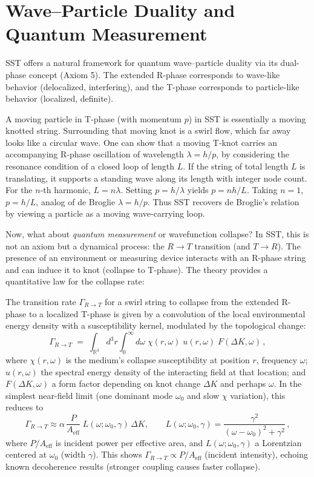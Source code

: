 \documentclass[10pt,reprint,aps,onecolumn,nofootinbib]{revtex4-2}
\begin{document}

	\section{Wave–Particle Duality and Quantum Measurement}
	SST offers a natural framework for quantum wave–particle duality via its dual-phase concept (Axiom 5). The extended R-phase corresponds to wave-like behavior (delocalized, interfering), and the T-phase corresponds to particle-like behavior (localized, definite).

	A moving particle in T-phase (with momentum $p$) in SST is essentially a moving knotted string. Surrounding that moving knot is a swirl flow, which far away looks like a circular wave. One can show that a moving T-knot carries an accompanying R-phase oscillation of wavelength $\lambda = h/p$, by considering the resonance condition of a closed loop of length $L$. If the string of total length $L$ is translating, it supports a standing wave along its length with integer node count. For the $n$-th harmonic, $L = n \lambda$. Setting $p = h/\lambda$ yields $p = n h/L$. Taking $n=1$, $p = h/L$, analog of de Broglie $\lambda = h/p$. Thus SST recovers de Broglie’s relation by viewing a particle as a moving wave-carrying loop.

	Now, what about \emph{quantum measurement} or wavefunction collapse? In SST, this is not an axiom but a dynamical process: the $R\to T$ transition (and $T\to R$). The presence of an environment or measuring device interacts with an R-phase string and can induce it to knot (collapse to T-phase). The theory provides a quantitative law for the collapse rate:

	\begin{tcolorbox}[title=Theorem 8.1: R$\to$T Transition Dynamics (Collapse Rate)]
		The transition rate $\Gamma_{R\to T}$ for a swirl string to collapse from the extended R-phase to a localized T-phase is given by a convolution of the local environmental energy density with a susceptibility kernel, modulated by the topological change:
		\[
			\Gamma_{R\to T} \;=\; \int_{\mathbb{R}^3}\! d^3r \int_0^{\infty}\! d\omega\;\chi(r,\omega)\;u(r,\omega)\;F(\Delta K,\omega)\,,
		\]
		where $\chi(r,\omega)$ is the medium’s collapse susceptibility at position $r$, frequency $\omega$; $u(r,\omega)$ the spectral energy density of the interacting field at that location; and $F(\Delta K,\omega)$ a form factor depending on knot change $\Delta K$ and perhaps $\omega$. In the simplest near-field limit (one dominant mode $\omega_0$ and slow $\chi$ variation), this reduces to
		\[
			\Gamma_{R\to T} \approx \alpha\, \frac{P}{A_{\text{eff}}}\; L(\omega; \omega_0,\gamma)\,\Delta K, \qquad
			L(\omega; \omega_0,\gamma) = \frac{\gamma^2}{(\omega-\omega_0)^2+\gamma^2}\,,
		\]
		where $P/A_{\text{eff}}$ is incident power per effective area, and $L(\omega; \omega_0,\gamma)$ a Lorentzian centered at $\omega_0$ (width $\gamma$). This shows $\Gamma_{R\to T} \propto P/A_{\text{eff}}$ (incident intensity), echoing known decoherence results (stronger coupling causes faster collapse).
	\end{tcolorbox}
\end{document}
